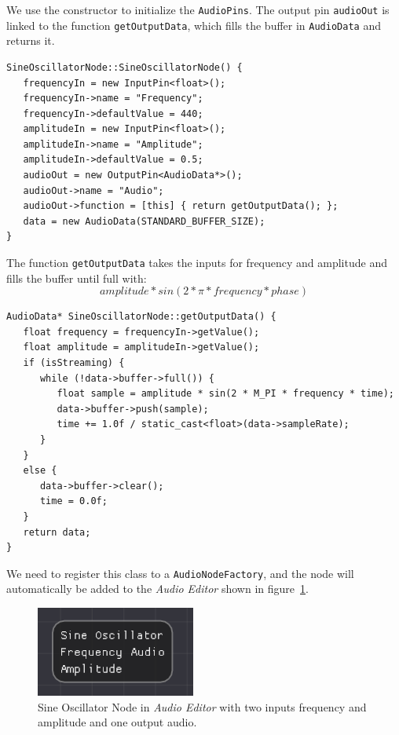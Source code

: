 \documentclass[conference]{IEEEtran}
\begin{document}
We use the constructor to initialize the \texttt{AudioPins}. The output pin \texttt{audioOut} is linked to the function \texttt{getOutputData}, which fills the buffer in \texttt{AudioData} and returns it.

\begin{lstlisting}
SineOscillatorNode::SineOscillatorNode() {
   frequencyIn = new InputPin<float>();
   frequencyIn->name = "Frequency";
   frequencyIn->defaultValue = 440;
   amplitudeIn = new InputPin<float>();
   amplitudeIn->name = "Amplitude";
   amplitudeIn->defaultValue = 0.5;
   audioOut = new OutputPin<AudioData*>();
   audioOut->name = "Audio";
   audioOut->function = [this] { return getOutputData(); };
   data = new AudioData(STANDARD_BUFFER_SIZE);
}
\end{lstlisting}

The function \texttt{getOutputData} takes the inputs for frequency and amplitude and fills the buffer until full with: $$amplitude * sin(2 * \pi * frequency * phase)$$

\begin{lstlisting}
AudioData* SineOscillatorNode::getOutputData() {
   float frequency = frequencyIn->getValue();
   float amplitude = amplitudeIn->getValue();
   if (isStreaming) {
      while (!data->buffer->full()) {
         float sample = amplitude * sin(2 * M_PI * frequency * time);
         data->buffer->push(sample);
         time += 1.0f / static_cast<float>(data->sampleRate);
      }
   }
   else {
      data->buffer->clear();
      time = 0.0f;
   }
   return data;
}
\end{lstlisting}

We need to register this class to a \texttt{AudioNodeFactory}, and the node will automatically be added to the \textit{Audio Editor} shown in figure~\ref{fig:sineoscillator}.

\begin{figure}[h]
    \centering
    \includegraphics[width=0.5\linewidth]{graphics/sineoscillatornode.png}
    \caption{Sine Oscillator Node in \textit{Audio Editor} with two inputs frequency and amplitude and one output audio.}
    \label{fig:sineoscillator}
\end{figure}
\end{document}
